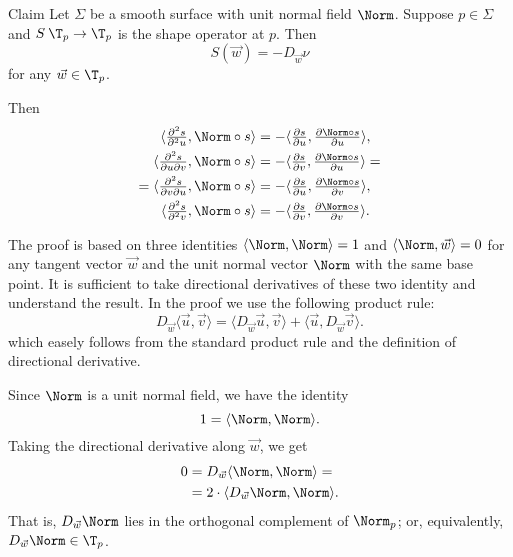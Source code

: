 \begin{thm}{Claim}
Let $\Sigma$ be a smooth surface with unit normal field $\Norm$.
Suppose $p\in \Sigma$ and $S\:\T_p\to\T_p$ is the shape operator at $p$.
Then 
\[S(\vec w)=-D_{\vec w}\nu\]
for any $\vec w\in \T_p$.
\end{thm}

















Then 
\begin{align*}
\langle\tfrac{\partial^2 s}{\partial^2 u},\Norm\circ s\rangle
&=
-\langle\tfrac{\partial s}{\partial u},\tfrac{\partial \Norm\circ s}{\partial u}\rangle,
\\
\langle\tfrac{\partial^2 s}{\partial u\partial v},\Norm\circ s\rangle
&=
-\langle\tfrac{\partial s}{\partial v},\tfrac{\partial \Norm\circ s}{\partial u}\rangle=
\\
=\langle\tfrac{\partial^2 s}{\partial v\partial u},\Norm\circ s\rangle
&=
-\langle\tfrac{\partial s}{\partial u},\tfrac{\partial \Norm\circ s}{\partial v}\rangle,
\\
\langle\tfrac{\partial^2 s}{\partial^2 v},\Norm\circ s\rangle
&=
-\langle\tfrac{\partial s}{\partial v},\tfrac{\partial \Norm\circ s}{\partial v}\rangle.
\end{align*}





The proof is based on three identities $\langle\Norm,\Norm\rangle=1$ and $\langle\Norm,\vec w\rangle=0$ for any tangent vector $\vec w$ and the unit normal vector $\Norm$ with the same base point.
It is sufficient to take directional derivatives of these two identity and understand the result.
In the proof we use the following product rule:
\[D_{\vec w}\langle\vec u,\vec v\rangle
=
\langle D_{\vec w}\vec u,\vec v\rangle+\langle\vec u,D_{\vec w}\vec v\rangle.\]
which easely follows from the standard product rule and the definition of directional derivative.

Since $\Norm$ is a unit normal field, we have the identity
\[1=\langle\Norm,\Norm\rangle.\]
Taking the directional derivative along $\vec w$, we get
\begin{align*}0&=D_{\vec w}\langle\Norm,\Norm\rangle=
\\
&=2\cdot \langle D_{\vec w}\Norm,\Norm\rangle.
\end{align*}
That is, $D_{\vec w}\Norm$ lies in the orthogonal complement of $\Norm_p$;
or, equivalently, $D_{\vec w}\Norm\in\T_p$.

